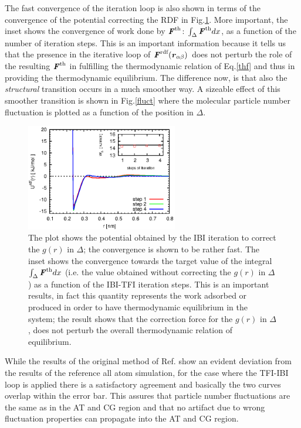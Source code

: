 \documentclass[aps,prb,preprint,citeautoscript]{revtex4}
\renewcommand{\v}[1]{\textbf{\textit{#1}}}
\begin{document}
The fast convergence of the iteration loop is also shown in terms of the convergence of the potential correcting the RDF in Fig.\ref{gpot}. More important, the inset shows the convergence of work done by ${\v F}^{\textrm{th}}$: $\int_{\Delta}{\v F}^{\textrm{th}}dx$, as a function of the number of iteration steps. This is an important information because it tells us that the presence in the iterative loop of $\v F^{\textrm{rdf}}(\v r_{\alpha\beta})$ does not perturb the role of the resulting ${\v F}^{\textrm{th}}$ in fulfilling the thermodynamic relation of Eq.\ref{thf} and thus in providing the thermodynamic equilibrium. The difference now, is that also the {\it structural} transition occurs in a much smoother way. A sizeable effect of this smoother transition is shown in Fig.\ref{fluct} where the molecular particle number fluctuation is plotted as a function of the position in $\Delta$.
\begin{figure}
  \centering
  \includegraphics[width=0.59\textwidth]{force-rdf.eps}
  \caption{The plot shows the potential obtained by the IBI iteration to correct the $g(r)$ in $\Delta$; the convergence is shown to be rather fast. The inset shows the convergence towards the target value of the integral $\int_{\Delta}{\v F}^{\textrm{th}}dx$ (i.e. the value obtained without correcting the $g(r)$ in $\Delta$) as a function of the IBI-TFI iteration steps. This is an important results, in fact this quantity represents the work adsorbed or produced in order to have thermodynamic equilibrium in the system; the result shows that the correction force for the $g(r)$ in $\Delta$, does not perturb the overall thermodynamic relation of equilibrium.}
  \label{gpot}
\end{figure}
While the results of the original method of Ref.\cite{prlgc} show an evident deviation from the results of the reference all atom simulation, for the case where the TFI-IBI loop is applied there is a satisfactory agreement and basically the two curves overlap within the error bar. This assures that particle number fluctuations are the same as in the AT and CG region and that no artifact due to wrong fluctuation properties can propagate into the AT and CG region.
\end{document}
